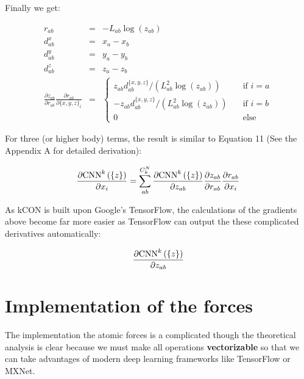 \documentclass{article}
\begin{document}
\noindent Finally we get:

\begin{eqnarray}
r_{ab} & = & -L_{ab}\log{\left( z_{ab} \right)} \\
d^x_{ab} & = & x_{a} - x_{b} \\
d^y_{ab} & = & y_{a} - y_{b} \\
d^z_{ab} & = & z_{a} - z_{b} \\
\frac{\partial{z_{ab}}}{\partial{r_{ab}}} \frac{\partial{r_{ab}}}{\partial{\{x, y, z\}_i}} 
& = &
\begin{cases}
z_{ab} d^{\{x,y,z\}}_{ab} / (L_{ab}^{2} \log{(z_{ab})}) & \quad \text{if } i = a \\
-z_{ab} d^{\{x,y,z\}}_{ab} / (L_{ab}^{2} \log{(z_{ab})}) & \quad \text{if } i = b \\
0 & \quad \text{else}
\end{cases}
\end{eqnarray}

For three (or higher body) terms, the result is similar to Equation 11 (See the Appendix 
A for detailed derivation):

\begin{eqnarray}
\frac{
	\partial{\boldmath{\mathrm{CNN}}^{k}\left(\left\{ z \right\} \right)}
}{
	\partial{x_i}
} 
=  \sum_{ab}^{C^N_k}{
\frac{
	\partial{\boldmath{\mathrm{CNN}}^{k}\left(\left\{ z \right\} \right)}
}{
	\partial{z_{ab}}
} \frac{\partial{z_{ab}}}{\partial{r_{ab}}}\frac{\partial{r_{ab}}}{\partial{x_i}}}
\end{eqnarray}

As kCON is built upon Google's TensorFlow, the calculations of the gradients above become 
far more easier as TensorFlow can output the these complicated derivatives automatically:

\begin{eqnarray}
\frac{
	\partial{\boldmath{\mathrm{CNN}}^{k}\left(\left\{ z \right\} \right)}
}{
	\partial{z_{ab}}
}	
\end{eqnarray}

\section{Implementation of the forces}

The implementation the atomic forces is a complicated though the theoretical analysis is 
clear because we must make all operations \textbf{vectorizable} so that we can take
advantages of modern deep learning frameworks like TensorFlow or MXNet. 
\end{document}
